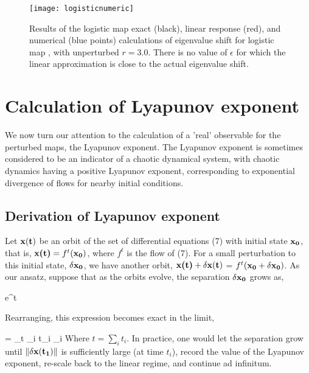 \documentclass[aps,pre,
                showpacs,
                twocolumn,
                groupedaddress,
                superscriptaddress,
                floatfix]{revtex4-1}
\begin{document}
\begin{figure}[htbp]
\texttt{[image: logisticnumeric]}
    \caption{\label{fig:logisticnumeric}
Results of the logistic map exact (black), linear response (red), and
numerical (blue points) calculations of eigenvalue shift for logistic map
, with unperturbed $r=3.0$. There is no value of
$\epsilon$ for which the linear approximation is close to the actual
eigenvalue shift.
        }
\end{figure}

\section{Calculation of Lyapunov exponent}
\label{sect:LyapExp}

We now turn our attention to the calculation of a 'real' observable for
the perturbed maps, the Lyapunov exponent. The Lyapunov exponent is
sometimes considered to be an indicator of a chaotic dynamical system,
with chaotic dynamics having a positive Lyapunov exponent, corresponding
to exponential divergence of flows for nearby initial conditions.

\subsection{Derivation of Lyapunov exponent}

Let $\bf x(t)$ be an orbit of the set of differential equations (7) with
initial state $\bf x_{0}$, that is, $\textbf{x(t)} = f^{t}(\textbf{$\bf
x_0$})$, where $f^t$ is the flow of (7). For a small perturbation to this
initial state, $\bf \delta x_{0}$, we have another orbit, $\textbf{x(t)}
+ \textbf{$\bf \delta x(t)$}$ = $f^{t}(\textbf{$\bf x_{0}$} +
\textbf{$\bf \delta x_{0}$})$. As our ansatz, suppose that as the orbits
evolve, the separation $\bf \delta x_{0}$ grows as,

\beq
e^{\lambda t} \approx \left\Vert {} \right\Vert
\eeq

Rearranging, this expression becomes exact in the limit,

\beq
\lambda = \lim_{t\rightarrow \infty}  \sum_{i} t_{i} \lambda_{i}
\eeq
Where $t = \sum_{i} t_{i}$. In practice, one would let the separation
grow until $\Vert \bf \delta x(t_{1}) \Vert$ is sufficiently large (at
time $t_{i}$), record the value of the Lyapunov exponent, re-scale back
to the linear regime, and continue ad infinitum.
\end{document}

